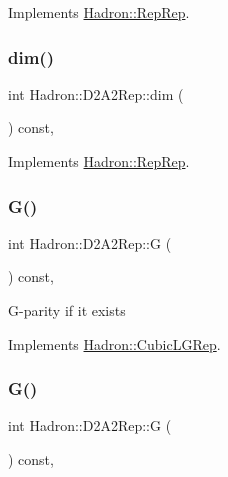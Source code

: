 Implements \mbox{\hyperlink{structHadron_1_1RepRep_a92c8802e5ed7afd7da43ccfd5b7cd92b}{Hadron\+::\+Rep\+Rep}}.

\mbox{\label{structHadron_1_1D2A2Rep_a3ac73e94eff9828876d64a771f037bb5}} 
\subsubsection{\texorpdfstring{dim()}{dim()}\hspace{0.1cm}{\footnotesize\ttfamily [3/3]}}
{\footnotesize\ttfamily int Hadron\+::\+D2\+A2\+Rep\+::dim (\begin{DoxyParamCaption}{ }\end{DoxyParamCaption}) const\hspace{0.3cm}{\ttfamily [inline]}, {\ttfamily [virtual]}}



Implements \mbox{\hyperlink{structHadron_1_1RepRep_a92c8802e5ed7afd7da43ccfd5b7cd92b}{Hadron\+::\+Rep\+Rep}}.

\mbox{\label{structHadron_1_1D2A2Rep_ad6b91beef1bc07a45a48d12192595cae}} 
\subsubsection{\texorpdfstring{G()}{G()}\hspace{0.1cm}{\footnotesize\ttfamily [1/2]}}
{\footnotesize\ttfamily int Hadron\+::\+D2\+A2\+Rep\+::G (\begin{DoxyParamCaption}{ }\end{DoxyParamCaption}) const\hspace{0.3cm}{\ttfamily [inline]}, {\ttfamily [virtual]}}

G-\/parity if it exists 

Implements \mbox{\hyperlink{structHadron_1_1CubicLGRep_ace26f7b2d55e3a668a14cb9026da5231}{Hadron\+::\+Cubic\+L\+G\+Rep}}.

\mbox{\label{structHadron_1_1D2A2Rep_ad6b91beef1bc07a45a48d12192595cae}} 
\subsubsection{\texorpdfstring{G()}{G()}\hspace{0.1cm}{\footnotesize\ttfamily [2/2]}}
{\footnotesize\ttfamily int Hadron\+::\+D2\+A2\+Rep\+::G (\begin{DoxyParamCaption}{ }\end{DoxyParamCaption}) const\hspace{0.3cm}{\ttfamily [inline]}, {\ttfamily [virtual]}}

